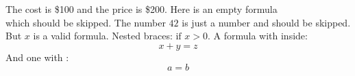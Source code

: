 The cost is \$100 and the price is \$200.
Here is an empty formula $$ $$ which should be skipped.
The number $42$ is just a number and should be skipped.
But $x$ is a valid formula.
Nested braces: $\text{if } x > 0$.
A formula with \label{eq:main} inside:
$$x + y = z \label{eq:sum}$$
And one with \tag:
$$a = b \tag{1.1}$$
